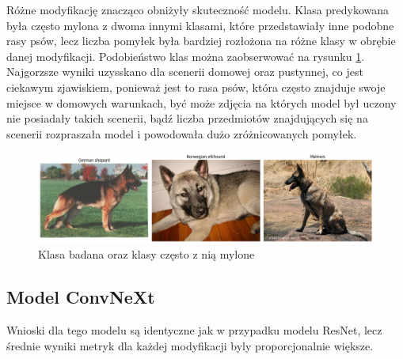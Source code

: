 Różne modyfikację znacząco obniżyły skuteczność modelu. Klasa predykowana była często mylona z dwoma innymi klasami, które przedstawiały inne podobne rasy psów, lecz liczba pomyłek była bardziej rozłożona na różne klasy w obrębie danej modyfikacji.
Podobieństwo klas można zaobserwować na rysunku \ref*{rys:235}. Najgorzsze wyniki uzysskano dla scenerii domowej oraz pustynnej, co jest ciekawym zjawiskiem, ponieważ jest to rasa psów, która często znajduje swoje miejsce w domowych warunkach, być może
zdjęcia na których model był uczony nie posiadały takich scenerii, bądź liczba przedmiotów znajdujących się na scenerii rozpraszała model i powodowała dużo zróżnicowanych pomyłek. 

\begin{figure}
	\centering\includegraphics[width=.9\textwidth]{img/235}
	\caption{Klasa badana oraz klasy często z nią mylone}
	\label{rys:235}
\end{figure}

\subsection*{Model ConvNeXt}

Wnioski dla tego modelu są identyczne jak w przypadku modelu ResNet, lecz średnie wyniki metryk dla każdej modyfikacji byly proporcjonalnie większe. 

